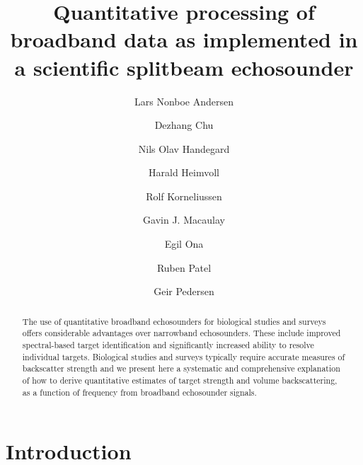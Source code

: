 \documentclass[preprint,12pt,TurnOnLineNumbers]{JASAnew}
\begin{document}
\title[]{Quantitative processing of broadband data as implemented in a scientific splitbeam echosounder}

\author{Lars Nonboe Andersen}

\author{Dezhang Chu}

\author{Nils Olav Handegard}

\author{Harald Heimvoll}

\author{Rolf Korneliussen}
\author{Gavin J. Macaulay}
\author{Egil Ona}

\author{Ruben Patel}

\author{Geir Pedersen}

\begin{abstract}
The use of quantitative broadband echosounders for biological studies and surveys offers considerable advantages over narrowband echosounders. These include improved spectral-based target identification and significantly increased ability to resolve individual targets. Biological studies and surveys typically require accurate measures of backscatter strength and we present here a systematic and comprehensive explanation of how to derive quantitative estimates of target strength and volume backscattering, as a function of frequency from broadband echosounder signals.

\end{abstract}

\maketitle


\section{Introduction}
\end{document}
